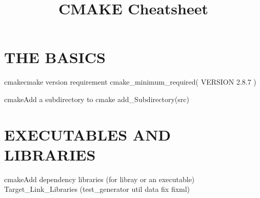 \documentclass[10pt,a4paper]{article}
\title{\color{w3schools}CMAKE Cheatsheet
}
\begin{document}
\maketitle
\small
\begin{multicols}{3}

\thispagestyle{empty}
\scriptsize

% 




\section{THE BASICS}

\begin{codebox}{cmake}{cmake version requirement}
cmake_minimum_required( VERSION 2.8.7 )

\end{codebox}

\begin{codebox}{cmake}{Add a subdirectory to cmake}
add_Subdirectory(src)

\end{codebox}

\section{EXECUTABLES AND LIBRARIES}


\begin{codebox}{cmake}{Add dependency libraries (for libray or an executable)}
Target_Link_Libraries (test_generator
	util data fix fixml)


\end{codebox}
\end{multicols}
\end{document}
